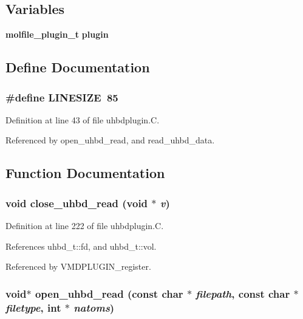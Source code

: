 \subsection*{Variables}
\begin{CompactItemize}
\item 
{\bf molfile\_\-plugin\_\-t} {\bf plugin}
\end{CompactItemize}


\subsection{Define Documentation}
\subsubsection{\setlength{\rightskip}{0pt plus 5cm}\#define LINESIZE\ 85}\label{uhbdplugin_8C_a0}




Definition at line 43 of file uhbdplugin.C.

Referenced by open\_\-uhbd\_\-read, and read\_\-uhbd\_\-data.

\subsection{Function Documentation}
\subsubsection{\setlength{\rightskip}{0pt plus 5cm}void close\_\-uhbd\_\-read (void $\ast$ {\em v})\hspace{0.3cm}{\tt  [static]}}\label{uhbdplugin_8C_a6}




Definition at line 222 of file uhbdplugin.C.

References uhbd\_\-t::fd, and uhbd\_\-t::vol.

Referenced by VMDPLUGIN\_\-register.
\subsubsection{\setlength{\rightskip}{0pt plus 5cm}void$\ast$ open\_\-uhbd\_\-read (const char $\ast$ {\em filepath}, const char $\ast$ {\em filetype}, int $\ast$ {\em natoms})\hspace{0.3cm}{\tt  [static]}}\label{uhbdplugin_8C_a3}




